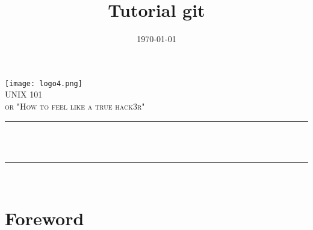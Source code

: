 \documentclass[12pt]{article}
\title{Tutorial git}								%
\date{\today}											%
\makeatletter
\let\thetitle\@title
\let\thedate\@date
\makeatother
\begin{document}

\begin{titlepage}
	\centering
    \vspace*{0.5 cm}
    \texttt{[image: logo4.png]}\\[1.0 cm]
    \textsc{\LARGE \newline\newline UNIX 101}\\[2.0 cm]
	\textsc{\Large or "How to feel like a true hack3r"}\\[0.5 cm]
	\rule{\linewidth}{0.2 mm} \\[0.4 cm]
	{ \huge \bfseries \thetitle}\\
	\rule{\linewidth}{0.2 mm} \\[1.5 cm]
	
%           
%        
	
	
    \thedate
    
    
    
	
\end{titlepage}


\tableofcontents
\pagebreak


\section{Foreword}
\end{document}
